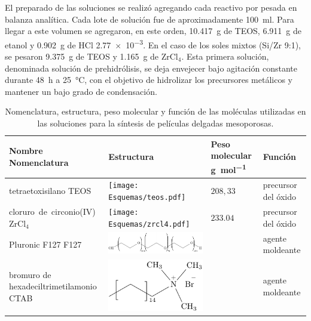			El preparado de las soluciones se realizó agregando cada reactivo por pesada en balanza analítica. Cada lote de solución fue de aproximadamente \SI{100}{\ml}. Para llegar a este volumen se agregaron, en este orden, \SI{10.417}{\gram} de TEOS, \SI{6.911}{\gram} de etanol y \SI{0.902}{\gram} de HCl \SI{2,77e-3}{\Molar}. En el caso de los soles mixtos (Si/Zr 9:1), se pesaron \SI{9.375}{\gram} de TEOS y \SI{1.165}{\gram} de ZrCl$_4$. Esta primera solución, denominada solución de prehidrólisis, se deja envejecer bajo agitación constante durante \SI{48}{\hour} a \SI{25}{\celsius}, con el objetivo de hidrolizar los precursores metálicos y mantener un bajo grado de condensación.\cite{Grosso2001}

				\begin{table}[ht!] 
						  \caption[Reactivos para los soles]{Nomenclatura, estructura, peso molecular y función de las moléculas utilizadas en las soluciones para la síntesis de películas delgadas mesoporosas.} 
				  		  \begin{tabular}{>{\raggedright\arraybackslash}m{2.40cm}>{\centering\arraybackslash}m{4cm}>{\centering\arraybackslash}m{2.35cm}>{\raggedright\arraybackslash}m{1.7cm}} 
				  		  \toprule
						  Nombre Nomenclatura    & Estructura & Peso molecular \si{g.mol^{-1}} & Función\\ \midrule
				      	  tetraetoxisilano TEOS & \texttt{[image: Esquemas/teos.pdf]} & $208,33$ & precursor del óxido  \\ \midrule
				      	  \mbox{cloruro de circonio(IV)}  ZrCl$_4$ & \texttt{[image: Esquemas/zrcl4.pdf]} & $233.04$ & precursor del óxido  \\ \midrule
				  		  Pluronic F127 F127    & \hspace*{-10px} \includegraphics[scale=0.5]{Esquemas/f127.pdf} & \multirow{1}{*}{$13800$}	 & agente moldeante	 \\ \midrule
				  		  bromuro de hexadeciltrimetilamonio  CTAB   & \hspace*{1cm} \includegraphics[scale=0.6]{Esquemas/ctab.pdf} & \multirow{1}{*}{$364.48$}	 & agente moldeante	 \\ \midrule

\end{tabular}
\end{table}
